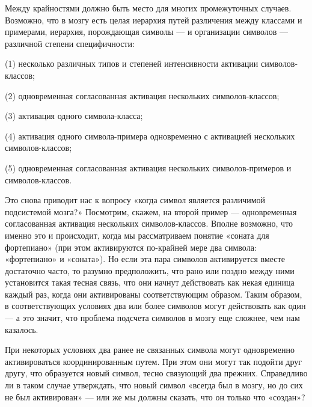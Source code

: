 \documentclass[../main.tex]{subfiles}
\begin{document}
Между крайностями должно быть место для многих промежуточных случаев. Возможно, что в мозгу есть целая иерархия путей различения между классами и примерами, иерархия, порождающая символы --- и организации символов --- различной степени специфичности:

(1) несколько различных типов и степеней интенсивности активации символов-классов;

(2) одновременная согласованная активация нескольких символов-классов;

(3) активация одного символа-класса;

(4) активация одного символа-примера одновременно с активацией нескольких символов-классов;

(5) одновременная согласованная активация нескольких символов-примеров и символов-классов.

Это снова приводит нас к вопросу «когда символ является различимой подсистемой мозга?» Посмотрим, скажем, на второй пример --- одновременная согласованная активация нескольких символов-классов. Вполне возможно, что именно это и происходит, когда мы рассматриваем понятие «соната для фортепиано» (при этом активируются по-крайней мере два символа: «фортепиано» и «соната»). Но если эта пара символов активируется вместе достаточно часто, то разумно предположить, что рано или поздно между ними установится такая тесная связь, что они начнут действовать как некая единица каждый раз, когда они активированы соответствующим образом. Таким образом, в соответствующих условиях два или более символов могут действовать как один --- а это значит, что проблема подсчета символов в мозгу еще сложнее, чем нам казалось.

При некоторых условиях два ранее не связанных символа могут одновременно активироваться координированным путем. При этом они могут так подойти друг другу, что образуется новый символ, тесно связующий два прежних. Справедливо ли в таком случае утверждать, что новый символ «всегда был в мозгу, но до сих не был активирован» --- или же мы должны сказать, что он только что «создан»?
\end{document}
